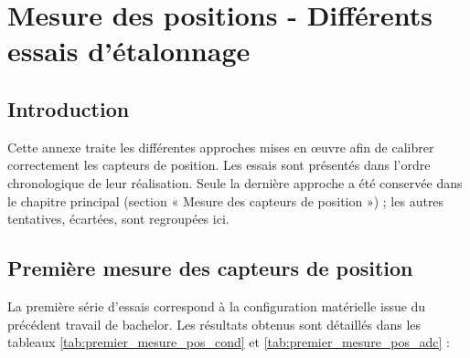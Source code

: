 \chapter{Mesure des positions - Différents essais d'étalonnage}
\label{annexe:MesPos}

\section{Introduction}
Cette annexe traite les différentes approches mises en œuvre afin de calibrer correctement les capteurs de position. Les essais sont présentés dans l'ordre chronologique de leur réalisation. Seule la dernière approche a été conservée dans le chapitre principal (section « Mesure des capteurs de position ») ; les autres tentatives, écartées, sont regroupées ici.

\section{Première mesure des capteurs de position}
La première série d'essais correspond à la configuration matérielle issue du précédent travail de bachelor. Les résultats obtenus sont détaillés dans les tableaux \ref{tab:premier_mesure_pos_cond} et \ref{tab:premier_mesure_pos_adc} :


